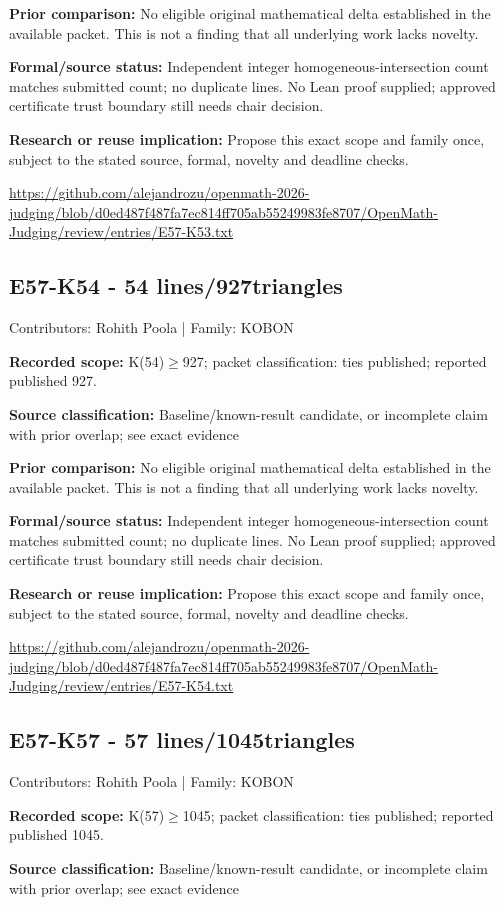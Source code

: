 \documentclass[11pt,a4paper]{article}
\begin{document}
\textbf{Prior comparison:} No eligible original mathematical delta established in the available packet. This is not a finding that all underlying work lacks novelty.

\textbf{Formal/source status:} Independent integer homogeneous-intersection count matches submitted count; no duplicate lines. No Lean proof supplied; approved certificate trust boundary still needs chair decision.

\textbf{Research or reuse implication:} Propose this exact scope and family once, subject to the stated source, formal, novelty and deadline checks.

{\small \url{https://github.com/alejandrozu/openmath-2026-judging/blob/d0ed487f487fa7ec814ff705ab55249983fe8707/OpenMath-Judging/review/entries/E57-K53.txt}\par}

\begin{samepage}
\subsection{E57-K54  -  54 lines/927triangles}
{\small Contributors: Rohith Poola | Family: KOBON\par}

\textbf{Recorded scope:} K(54)\ensuremath{\geq}927; packet classification: ties published; reported published 927.

\end{samepage}
\textbf{Source classification:} Baseline/known-result candidate, or incomplete claim with prior overlap; see exact evidence

\textbf{Prior comparison:} No eligible original mathematical delta established in the available packet. This is not a finding that all underlying work lacks novelty.

\textbf{Formal/source status:} Independent integer homogeneous-intersection count matches submitted count; no duplicate lines. No Lean proof supplied; approved certificate trust boundary still needs chair decision.

\textbf{Research or reuse implication:} Propose this exact scope and family once, subject to the stated source, formal, novelty and deadline checks.

{\small \url{https://github.com/alejandrozu/openmath-2026-judging/blob/d0ed487f487fa7ec814ff705ab55249983fe8707/OpenMath-Judging/review/entries/E57-K54.txt}\par}

\begin{samepage}
\subsection{E57-K57  -  57 lines/1045triangles}
{\small Contributors: Rohith Poola | Family: KOBON\par}

\textbf{Recorded scope:} K(57)\ensuremath{\geq}1045; packet classification: ties published; reported published 1045.

\end{samepage}
\textbf{Source classification:} Baseline/known-result candidate, or incomplete claim with prior overlap; see exact evidence
\end{document}
